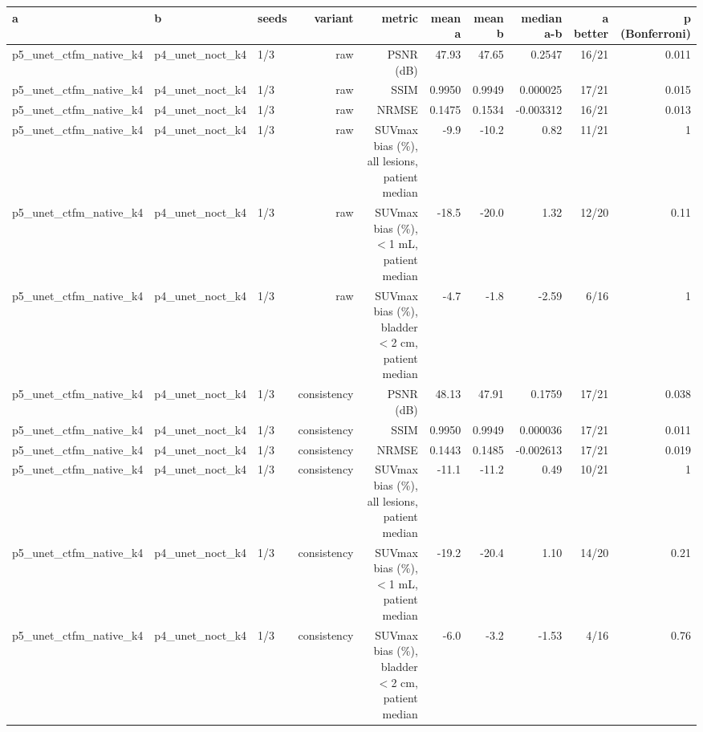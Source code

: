 \begin{tabular}{lllrrrrrrr}
\toprule
a & b & seeds & variant & metric & mean a & mean b & median a-b & a better & p (Bonferroni) \\
\midrule
p5\_unet\_ctfm\_native\_k4 & p4\_unet\_noct\_k4 & 1/3 & raw & PSNR (dB) & 47.93 & 47.65 & 0.2547 & 16/21 & 0.011 \\
p5\_unet\_ctfm\_native\_k4 & p4\_unet\_noct\_k4 & 1/3 & raw & SSIM & 0.9950 & 0.9949 & 0.000025 & 17/21 & 0.015 \\
p5\_unet\_ctfm\_native\_k4 & p4\_unet\_noct\_k4 & 1/3 & raw & NRMSE & 0.1475 & 0.1534 & -0.003312 & 16/21 & 0.013 \\
p5\_unet\_ctfm\_native\_k4 & p4\_unet\_noct\_k4 & 1/3 & raw & SUVmax bias (\%), all lesions, patient median & -9.9 & -10.2 & 0.82 & 11/21 & 1 \\
p5\_unet\_ctfm\_native\_k4 & p4\_unet\_noct\_k4 & 1/3 & raw & SUVmax bias (\%), $<$1 mL, patient median & -18.5 & -20.0 & 1.32 & 12/20 & 0.11 \\
p5\_unet\_ctfm\_native\_k4 & p4\_unet\_noct\_k4 & 1/3 & raw & SUVmax bias (\%), bladder $<$2 cm, patient median & -4.7 & -1.8 & -2.59 & 6/16 & 1 \\
p5\_unet\_ctfm\_native\_k4 & p4\_unet\_noct\_k4 & 1/3 & consistency & PSNR (dB) & 48.13 & 47.91 & 0.1759 & 17/21 & 0.038 \\
p5\_unet\_ctfm\_native\_k4 & p4\_unet\_noct\_k4 & 1/3 & consistency & SSIM & 0.9950 & 0.9949 & 0.000036 & 17/21 & 0.011 \\
p5\_unet\_ctfm\_native\_k4 & p4\_unet\_noct\_k4 & 1/3 & consistency & NRMSE & 0.1443 & 0.1485 & -0.002613 & 17/21 & 0.019 \\
p5\_unet\_ctfm\_native\_k4 & p4\_unet\_noct\_k4 & 1/3 & consistency & SUVmax bias (\%), all lesions, patient median & -11.1 & -11.2 & 0.49 & 10/21 & 1 \\
p5\_unet\_ctfm\_native\_k4 & p4\_unet\_noct\_k4 & 1/3 & consistency & SUVmax bias (\%), $<$1 mL, patient median & -19.2 & -20.4 & 1.10 & 14/20 & 0.21 \\
p5\_unet\_ctfm\_native\_k4 & p4\_unet\_noct\_k4 & 1/3 & consistency & SUVmax bias (\%), bladder $<$2 cm, patient median & -6.0 & -3.2 & -1.53 & 4/16 & 0.76 \\
\bottomrule
\end{tabular}
